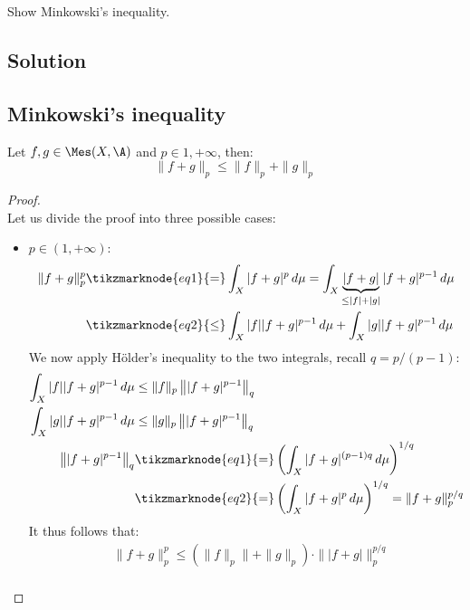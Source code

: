 
\question
Show Minkowski's inequality.

\subsection*{Solution}

\subsection{Minkowski's inequality} \label{minkowski}
Let $f,g \in \Mes(X,\A)$ and $p\in{1,+\infty}$, then:
\[ \| f + g \|_p \leq \| f \|_p + \| g \|_p \]

\begin{proof}
    \hspace*{\fill}\\ %
    Let us divide the proof into three possible cases:
    \begin{itemize}
        \item $p\in(1,+\infty)$:
            \begin{align*}
                \|f+g\|_p^p & \tikzmarknode{eq1}{=} \int_X |f+g|^p \, d\mu = \int_X \underbrace{|f+g|}_{\leq |f| + |g|} |f+g|^{p-1} \, d\mu \\
                & \tikzmarknode{eq2}{\leq} \int_X |f| |f+g|^{p-1} \, d\mu + \int_X |g| |f+g|^{p-1} \, d\mu
            \end{align*}
            We now apply Hölder's inequality to the two integrals, recall $q=p/(p-1)$:
            \begin{align*}
                \int_X |f| |f+g|^{p-1} \, d\mu &\leq \|f\|_p \left\| |f+g|^{p-1} \right\|_q \\
                \int_X |g| |f+g|^{p-1} \, d\mu &\leq \|g\|_p \left\| |f+g|^{p-1} \right\|_q \\
                \left\| |f+g|^{p-1} \right\|_q & \tikzmarknode{eq1}{=} \left( \int_X |f+g|^{(p-1)q} \, d\mu \right)^{1/q} \\
                & \tikzmarknode{eq2}{=} \left( \int_X |f+g|^p \, d\mu \right)^{1/q} = \|f+g\|_p^{p/q}
            \end{align*}
            It thus follows that:
            \begin{align*}
                & \|f+g\|_p^p \leq (\|f\|_p\|+\|g\|_p) \cdot \| |f+g| \|_p^{p/q} \\

\end{align*}
\end{itemize}
\end{proof}
